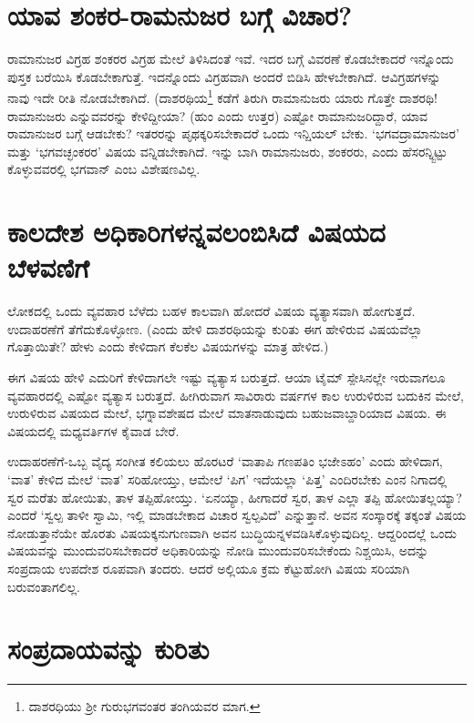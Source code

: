 \section*{ಯಾವ ಶಂಕರ-ರಾಮನುಜರ ಬಗ್ಗೆ ವಿಚಾರ?}

ರಾಮಾನುಜರ ವಿಗ್ರಹ ಶಂಕರರ ವಿಗ್ರಹ ಮೇಲೆ ತಿಳಿಸಿದಂತೆ ಇವೆ. ಇದರ ಬಗ್ಗೆ ವಿವರಣೆ ಕೊಡಬೇಕಾದರೆ ಇನ್ನೊಂದು ಪುಸ್ತಕ ಬರೆಯಿಸಿ ಕೊಡಬೇಕಾಗುತ್ತೆ. ಇದನ್ನೊಂದು ವಿಗ್ರಹವಾಗಿ ಅಂದರೆ ಬಿಡಿಸಿ ಹೇಳಬೇಕಾಗಿದೆ. ಆವಿಗ್ರಹಗಳನ್ನು ನಾವು ಇದೇ ರೀತಿ ನೋಡಬೇಕಾಗಿದೆ. (ದಾಶರಥಿಯ\footnote{ದಾಶರಧಿಯು ಶ್ರೀ ಗುರುಭಗವಂತರ ತಂಗಿಯವರ ಮಾಗ.} ಕಡೆಗೆ ತಿರುಗಿ ರಾಮಾನುಜರು ಯಾರು ಗೊತ್ತೇ ದಾಶರಥಿ! ರಾಮಾನುಜರು ಎನ್ನುವವರನ್ನು ಕೇಳಿದ್ದೀಯಾ? (ಹುಂ ಎಂದು ಉತ್ತರ) ಎಷ್ಟೋ ರಾಮಾನುಜರಿದ್ದಾರೆ, ಯಾವ ರಾಮಾನುಜರ ಬಗ್ಗೆ ಆಡಬೇಕು? ಇತರರನ್ನು  ಪೃಥಕ್ಕರಿಸಬೇಕಾದರೆ ಒಂದು ಇನ್ಷಿಯಲ್ ಬೇಕು. `ಭಗವದ್ರಾಮಾನುಜರ' ಮತ್ತು `ಭಗವಚ್ಛಂಕರರ' ವಿಷಯ ವನ್ನಿಡಬೇಕಾಗಿದೆ. ಇನ್ನು ಬಾಗಿ ರಾಮಾನುಜರು, ಶಂಕರರು, ಎಂದು ಹೆಸರನ್ನ್ಬಿಟ್ಟು ಕೊಳ್ಳುವವರಲ್ಲಿ ಭಗವಾನ್ ಎಂಬ ವಿಶೇಷಣವಿಲ್ಲ.

\section*{ಕಾಲದೇಶ ಅಧಿಕಾರಿಗಳನ್ನವಲಂಬಿಸಿದೆ ವಿಷಯದ ಬೆಳವಣಿಗೆ}

ಲೋಕದಲ್ಲಿ ಒಂದು ವ್ಯವಹಾರ ಬೆಳೆದು ಬಹಳ ಕಾಲವಾಗಿ ಹೋದರೆ ವಿಷಯ ವ್ಯತ್ಯಾಸವಾಗಿ ಹೋಗುತ್ತದೆ. ಉದಾಹರಣೆಗೆ ತೆಗೆದುಕೊಳ್ಳೋಣ. (ಎಂದು ಹೇಳಿ ದಾಶರಥಿಯನ್ನು ಕುರಿತು ಈಗ ಹೇಳಿರುವ ವಿಷಯವೆಲ್ಲಾ ಗೊತ್ತಾಯಿತೇ? ಹೇಳು ಎಂದು ಕೇಳಿದಾಗ ಕೆಲಕೆಲ ವಿಷಯಗಳನ್ನು ಮಾತ್ರ ಹೇಳಿದ.)

ಈಗ ವಿಷಯ ಹೇಳಿ ಎದುರಿಗೆ ಕೇಳಿದಾಗಲೇ ಇಷ್ಟು  ವ್ಯತ್ಯಾಸ ಬರುತ್ತದೆ. ಆಯಾ ಟೈಮ್ ಸ್ಪೇಸಿನಲ್ಲೇ ಇರುವಾಗಲೂ ವ್ಯವಹಾರದಲ್ಲಿ ಎಷ್ಟೋ ವ್ಯತ್ಯಾಸ ಬರುತ್ತದೆ. ಹೀಗಿರುವಾಗ ಸಾವಿರಾರು ವರ್ಷಗಳ ಕಾಲ ಉರುಳಿರುವ ಬದುಕಿನ ಮೇಲೆ, ಉರುಳಿರುವ ವಿಷಯದ ಮೇಲೆ, ಭಗ್ನಾವಶೇಷದ ಮೇಲೆ ಮಾತನಾಡುವುದು ಬಹುಜವಾಬ್ದಾರಿಯಾದ ವಿಷಯ. ಈ ವಿಷಯದಲ್ಲಿ ಮಧ್ಯವರ್ತಿಗಳ ಕೈವಾಡ ಬೇರೆ.

ಉದಾಹರಣೆಗೆ-ಒಬ್ಬ ವೈದ್ಯ ಸಂಗೀತ ಕಲಿಯಲು ಹೊರಟರೆ `ವಾತಾಪಿ ಗಣಪತಿಂ ಭಜೇಽಹಂ' ಎಂದು ಹೇಳಿದಾಗ, `ವಾತ' ಕೇಳಿದ ಮೇಲೆ `ವಾತ' ಸರಿಹೋಯ್ತು, ಆಮೇಲೆ  `ಪಿಗ' ಇದೆಯಲ್ಲಾ `ಪಿತ್ತ' ಎಂದಿರಬೇಕು ಎಂನ ನಿಗಾದಲ್ಲಿ ಸ್ವರ ಮರೆತು ಹೋಯಿತು, ತಾಳ ತಪ್ಪಿಹೋಯ್ತು. `ಏನಯ್ಯಾ, ಹೀಗಾದರೆ ಸ್ವರ, ತಾಳ ಎಲ್ಲಾ ತಪ್ಪಿ ಹೋಯಿತಲ್ಲಯ್ಯಾ? ಎಂದರೆ `ಸ್ವಲ್ಪ ತಾಳೀ ಸ್ವಾಮಿ, ಇಲ್ಲಿ ಮಾಡಬೇಕಾದ ವಿಚಾರ ಸ್ವಲ್ಪವಿದೆ' ಎನ್ನುತ್ತಾನೆ. ಅವನ ಸಂಸ್ಕಾರಕ್ಕೆ ತಕ್ಕಂತೆ ವಿಷಯ ನೋಡುತ್ತಾನೆಯೇ ಹೊರತು ವಿಷಯಕ್ಕನುಗುಣವಾಗಿ ಅವನ ಬುದ್ಧಿಯನ್ನಳವಡಿಸಿಕೊಳ್ಳುವುದಿಲ್ಲ. ಆದ್ದರಿಂದಲ್ಲೆ ಒಂದು ವಿಷಯವನ್ನು ಮುಂದುವರಿಸಬೇಕಾದರೆ ಅಧಿಕಾರಿಯನ್ನು ನೋಡಿ ಮುಂದುವರಿಸಬೇಕೆಂದು ನಿಶ್ಚಯಿಸಿ, ಅದನ್ನು ಸಂಪ್ರದಾಯ ಉಪದೇಶ ರೂಪವಾಗಿ ತಂದರು. ಆದರೆ ಅಲ್ಲಿಯೂ ಕ್ರಮ ಕೆಟ್ಟುಹೋಗಿ ವಿಷಯ ಸರಿಯಾಗಿ ಬರುವಂತಾಗಲಿಲ್ಲ. 

\section*{ಸಂಪ್ರದಾಯವನ್ನು ಕುರಿತು}
 
